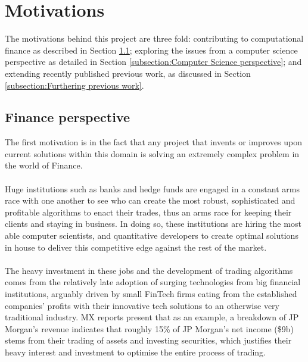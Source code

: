 \documentclass[ %
                    author={Ashwinder Khurana},
                supervisor={Prof Dave Cliff},
                    degree={MEng},
                     title={The Deeply Reinforced Trader},
                  subtitle={},
                      type={enterprise},
                      year={2020} ]{dissertation}
\begin{document}
\section{Motivations}
 
The motivations behind this project are three fold: contributing to computational finance as described in Section \ref{subsection:Finance perspective}; exploring the issues from a computer science perspective as detailed in Section \ref{subsection:Computer Science perspective}; and extending recently published previous work, as discussed in Section \ref{subsection:Furthering previous work}. 

\vspace{0.5cm}
\subsection{Finance perspective}
\label{subsection:Finance perspective}
\vspace{0.5cm} 
The first motivation is in the fact that any project that invents or improves upon current solutions within this domain is solving an extremely complex problem in the world of Finance. 
\\
\\
Huge institutions such as banks and hedge funds are engaged in a constant arms race with one another to see who can create the most robust, sophisticated and profitable algorithms to enact their trades, thus an arms race for keeping their clients and staying in business. In doing so, these institutions are hiring the most able computer scientists, and quantitative developers to create optimal solutions in house to deliver this competitive edge against the rest of the market. 
\\
\\
The heavy investment in these jobs and the development of trading algorithms comes from the relatively late adoption of surging technologies from big financial institutions, arguably driven by small FinTech firms eating from the established companies' profits with their innovative tech solutions to an otherwise very traditional industry.  MX reports \cite{mx-banks-profit-breakdown} present that as an example, a breakdown of JP Morgan's revenue indicates that roughly 15\% of JP Morgan's net income (\$9b) stems from their trading of assets and investing securities, which justifies their heavy interest and investment to optimise the entire process of trading. 
\\
\\
\noindent 
\end{document}
